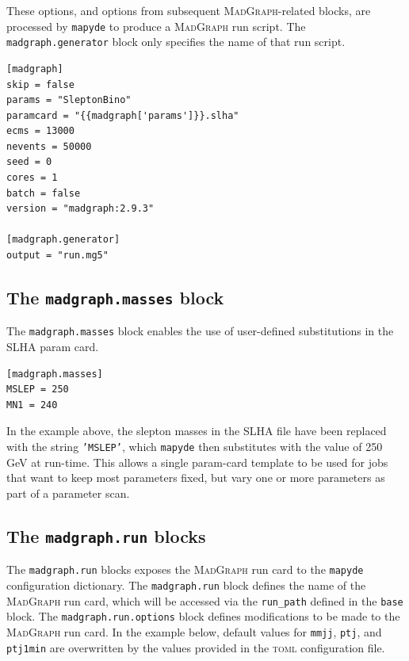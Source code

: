 \documentclass{article}
\newcommand{\mapyde}{\texttt{mapyde}}
\newcommand{\madgraph}{\textsc{MadGraph}}
\newcommand{\toml}{\textsc{toml}}
\begin{document}
These options, and options from subsequent \madgraph-related blocks, are processed by \mapyde{} to produce a \madgraph{} run script.  The \texttt{madgraph.generator} block only specifies the name of that run script.

\begin{listing}[H]
	\begin{verbatim}
[madgraph]
skip = false
params = "SleptonBino"
paramcard = "{{madgraph['params']}}.slha"
ecms = 13000
nevents = 50000
seed = 0
cores = 1
batch = false
version = "madgraph:2.9.3"

[madgraph.generator]
output = "run.mg5"
        \end{verbatim}
	\caption{The \texttt{madgraph} block of an example \toml{} configuration file for generating slepton events.}
	\label{slepton-config-madgraph}
\end{listing}


\subsection{The \texttt{madgraph.masses} block}
\label{ssec:the-madgraph-masses-block}

The \texttt{madgraph.masses} block enables the use of user-defined substitutions in the SLHA param card.

\begin{listing}[H]
	\begin{verbatim}
[madgraph.masses]
MSLEP = 250
MN1 = 240
        \end{verbatim}
	\caption{The \texttt{madgraph.masses} block of an example \toml{} configuration file for generating slepton events.}
	\label{slepton-config-masses}
\end{listing}

In the example above, the slepton masses in the SLHA file have been replaced with the string \texttt{'{{MSLEP}}'}, which \mapyde{} then substitutes with the value of 250 GeV at run-time.  This allows a single param-card template to be used for jobs that want to keep most parameters fixed, but vary one or more parameters as part of a parameter scan.

\subsection{The \texttt{madgraph.run} blocks}
\label{ssec:the-madgraph-run-blocks}

The \texttt{madgraph.run} blocks exposes the \madgraph{} run card to the \mapyde{} configuration dictionary.  The \texttt{madgraph.run} block defines the name of the \madgraph{} run card, which will be accessed via the \texttt{run\_path} defined in the \texttt{base} block.  The \texttt{madgraph.run.options} block defines modifications to be made to the \madgraph{} run card.  In the example below, default values for \texttt{mmjj}, \texttt{ptj}, and \texttt{ptj1min} are overwritten by the values provided in the \toml{} configuration file.
\end{document}
